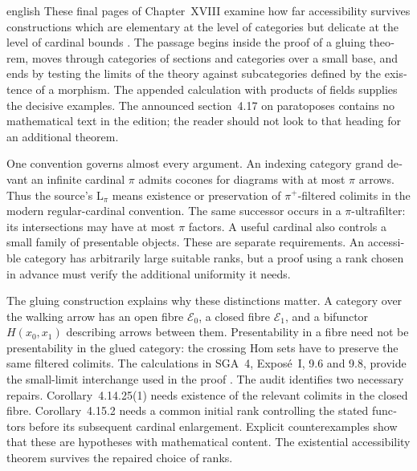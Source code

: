 \begin{otherlanguage}{english}
\begin{otherlanguage*}{english}
These final pages of Chapter~XVIII examine how far accessibility survives constructions which are elementary at the level of categories but delicate at the level of cardinal bounds \citep{Grothendieck1990XVIII}. The passage begins inside the proof of a gluing theorem, moves through categories of sections and categories over a small base, and ends by testing the limits of the theory against subcategories defined by the existence of a morphism. The appended calculation with products of fields supplies the decisive examples. The announced section~4.17 on paratoposes contains no mathematical text in the edition; the reader should not look to that heading for an additional theorem.

One convention governs almost every argument. An indexing category grand devant an infinite cardinal $\pi$ admits cocones for diagrams with at most $\pi$ arrows. Thus the source's $\mathrm L_\pi$ means existence or preservation of $\pi^+$-filtered colimits in the modern regular-cardinal convention. The same successor occurs in a $\pi$-ultrafilter: its intersections may have at most $\pi$ factors. A useful cardinal also controls a small family of presentable objects. These are separate requirements. An accessible category has arbitrarily large suitable ranks, but a proof using a rank chosen in advance must verify the additional uniformity it needs.

The gluing construction explains why these distinctions matter. A category over the walking arrow has an open fibre $\mathcal E_0$, a closed fibre $\mathcal E_1$, and a bifunctor $H(x_0,x_1)$ describing arrows between them. Presentability in a fibre need not be presentability in the glued category: the crossing Hom sets have to preserve the same filtered colimits. The calculations in SGA~4, Expos\'e~I, 9.6 and 9.8, provide the small-limit interchange used in the proof \citep{SGA4I1972}. The audit identifies two necessary repairs. Corollary~4.14.25(1) needs existence of the relevant colimits in the closed fibre. Corollary~4.15.2 needs a common initial rank controlling the stated functors before its subsequent cardinal enlargement. Explicit counterexamples show that these are hypotheses with mathematical content. The existential accessibility theorem survives the repaired choice of ranks.


\end{otherlanguage*}
\end{otherlanguage}

